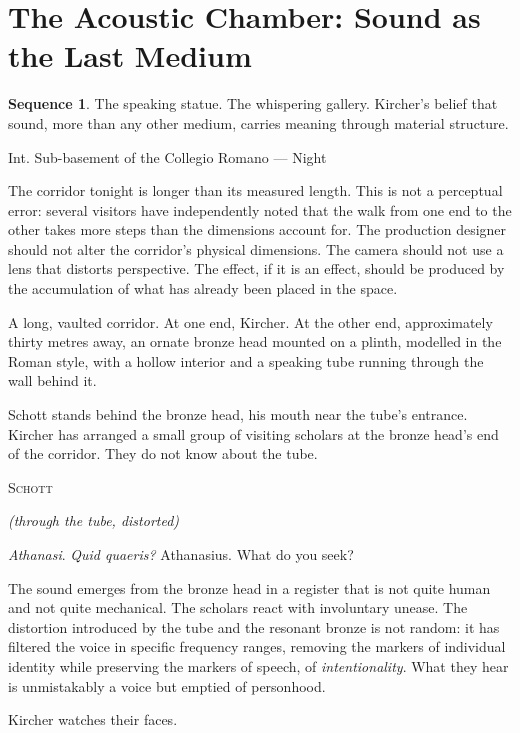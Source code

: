 \documentclass[12pt, a4paper, twoside]{memoir}
\theoremstyle{definition}
\newtheorem{sequence}{Sequence}[chapter]
\theoremstyle{remark}
\newenvironment{sceneheading}{%
  \vspace{8pt}%
  \noindent\begin{mdframed}[
    linecolor=arkgold,
    linewidth=0.8pt,
    leftmargin=0pt,
    rightmargin=0pt,
    innerleftmargin=6pt,
    innerrightmargin=6pt,
    innertopmargin=4pt,
    innerbottommargin=4pt,
    backgroundcolor=arkgold!6
  ]%
  \noindent\textsc\bgroup\small
}{%
  \egroup\end{mdframed}\vspace{4pt}%
}
\newenvironment{action}{%
  \vspace{4pt}%
  \noindent\begin{minipage}{\linewidth}%
  \setlength{\parindent}{0pt}%
  \itshape\color{kircherink}%
}{%
  \end{minipage}\vspace{6pt}%
}
\newenvironment{dialogue}[1]{%
  \vspace{6pt}%
  \noindent\hspace{24mm}%
  \begin{minipage}{0.6\linewidth}%
  \begin{center}%
  {\small\textsc{#1}}%
  \end{center}%
  \vspace{2pt}%
}{%
  \end{minipage}\vspace{6pt}%
}
\newcommand{\paren}[1]{%
  \begin{center}%
  \small\itshape\color{plaguegrey}(#1)%
  \end{center}%
}
\newenvironment{museumnote}{%
  \vspace{4pt}%
  \noindent\begin{mdframed}[
    linecolor=arkgold!60,
    linewidth=0.4pt,
    leftline=true, rightline=false, topline=false, bottomline=false,
    innerleftmargin=8pt,
    innerrightmargin=0pt,
    innertopmargin=2pt,
    innerbottommargin=2pt,
    backgroundcolor=arkgold!4
  ]%
  \footnotesize\color{plaguegrey}%
}{%
  \end{mdframed}\vspace{4pt}%
}
\begin{document}
\clearpage

\section{The Acoustic Chamber: Sound as the Last Medium}

\begin{sequence}
\label{seq:acoustic}
The speaking statue. The whispering gallery. Kircher's belief that sound, more than any other medium, carries meaning through material structure.
\end{sequence}

\begin{sceneheading}
Int. Sub-basement of the Collegio Romano --- Night
\end{sceneheading}

\begin{museumnote}
The corridor tonight is longer than its measured length. This is not a perceptual error: several visitors have independently noted that the walk from one end to the other takes more steps than the dimensions account for. The production designer should not alter the corridor's physical dimensions. The camera should not use a lens that distorts perspective. The effect, if it is an effect, should be produced by the accumulation of what has already been placed in the space.
\end{museumnote}

\begin{action}
A long, vaulted corridor. At one end, Kircher. At the other end, approximately thirty metres away, an ornate bronze head mounted on a plinth, modelled in the Roman style, with a hollow interior and a speaking tube running through the wall behind it.

Schott stands behind the bronze head, his mouth near the tube's entrance. Kircher has arranged a small group of visiting scholars at the bronze head's end of the corridor. They do not know about the tube.
\end{action}

\begin{dialogue}{Schott}
\paren{through the tube, distorted}
\textit{Athanasi}. \textit{Quid quaeris?} \quad Athanasius. What do you seek?
\end{dialogue}

\begin{action}
The sound emerges from the bronze head in a register that is not quite human and not quite mechanical. The scholars react with involuntary unease. The distortion introduced by the tube and the resonant bronze is not random: it has filtered the voice in specific frequency ranges, removing the markers of individual identity while preserving the markers of speech, of \textit{intentionality}. What they hear is unmistakably a voice but emptied of personhood.

Kircher watches their faces.
\end{action}
\end{document}
